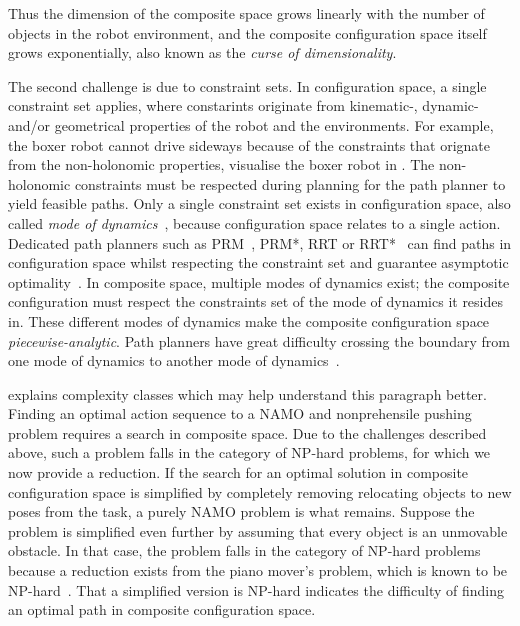 Thus the dimension of the composite space grows linearly with the number of objects in the robot environment, and the composite configuration space itself grows exponentially, also known as the \textit{curse of dimensionality}.\bs

The second challenge is due to constraint sets. In configuration space, a single constraint set applies, where constarints originate from kinematic-, dynamic- and/or geometrical properties of the robot and the environments. For example, the boxer robot cannot drive sideways because of the constraints that orignate from the non-holonomic properties, visualise the boxer robot in . The non-holonomic constraints must be respected during planning for the path planner to yield feasible paths. Only a single constraint set exists in configuration space, also called \textit{mode of dynamics}~\cite{hauser_multimodal_2010}, because configuration space relates to a single action. Dedicated path planners such as \acs{PRM}~\cite{hsu_path_1997}, \acs{PRM*}, \acs{RRT} or \acs{RRT*}~\cite{karaman_samplingbased_2011} can find paths in configuration space whilst respecting the constraint set and guarantee asymptotic optimality~\cite{karaman_samplingbased_2011}. In composite space, multiple modes of dynamics exist; the composite configuration must respect the constraints set of the mode of dynamics it resides in. These different modes of dynamics make the composite configuration space \textit{piecewise-analytic}. Path planners have great difficulty crossing the boundary from one mode of dynamics to another mode of dynamics~\cite{vega-brown_asymptotically_2020}.\bs

 explains complexity classes which may help understand this paragraph better. Finding an optimal action sequence to a \ac{NAMO} and nonprehensile pushing problem requires a search in composite space. Due to the challenges described above, such a problem falls in the category of \ac{NP-hard} problems, for which we now provide a reduction. If the search for an optimal solution in composite configuration space is simplified by completely removing relocating objects to new poses from the task, a purely \ac{NAMO} problem is what remains. Suppose the problem is simplified even further by assuming that every object is an unmovable obstacle. In that case, the problem falls in the category of \ac{NP-hard} problems because a reduction exists from the piano mover's problem, which is known to be \ac{NP-hard}~\cite{reif_motion_1985}. That a simplified version is \ac{NP-hard} indicates the difficulty of finding an optimal path in composite configuration space.\bs

